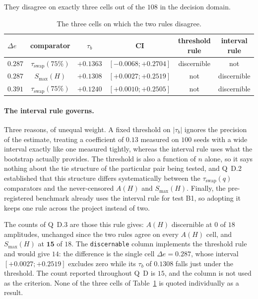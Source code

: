 \documentclass[11pt,a4paper]{article}
\begin{document}
They disagree on exactly three cells out of the $108$ in the decision domain.

\begin{table}[htbp]
  \centering
  \begin{tabular}{lccccc}
    \toprule
    $\Delta e$ & comparator & $\tau_b$ & CI & threshold rule & interval rule \\
    \midrule
    $0.287$ & $\tau_{\mathrm{swap}}(75\%)$ & $+0.1363$ & $[-0.0068 ; +0.2704]$ & discernible & not \\
    $0.287$ & $S_{\max}(H)$                & $+0.1308$ & $[+0.0027 ; +0.2519]$ & not & discernible \\
    $0.391$ & $\tau_{\mathrm{swap}}(75\%)$ & $+0.1240$ & $[+0.0010 ; +0.2505]$ & not & discernible \\
    \bottomrule
  \end{tabular}
  \caption{The three cells on which the two rules disagree.}
  \label{tab:regles}
\end{table}

\paragraph{The interval rule governs.} Three reasons, of unequal weight. A fixed threshold
on $|\tau_b|$ ignores the precision of the estimate, treating a coefficient of $0.13$
measured on $100$ seeds with a wide interval exactly like one measured tightly, whereas the
interval rule uses what the bootstrap actually provides. The threshold is also a function
of $n$ alone, so it says nothing about the tie structure of the particular pair being
tested, and Q~D.2 established that this structure differs systematically between the
$\tau_{\mathrm{swap}}(q)$ comparators and the never-censored $A(H)$ and $S_{\max}(H)$.
Finally, the pre-registered benchmark already uses the interval rule for test B1, so
adopting it keeps one rule across the project instead of two.

The counts of Q~D.3 are those this rule gives: $A(H)$ discernible at $0$ of $18$
amplitudes, unchanged since the two rules agree on every $A(H)$ cell, and $S_{\max}(H)$ at
$\mathbf{15}$ of $18$. The \texttt{discernable} column implements the threshold rule and
would give $14$: the difference is the single cell $\Delta e = 0.287$, whose interval
$[+0.0027 ; +0.2519]$ excludes zero while its $\tau_b$ of $0.1308$ falls just under the
threshold. The count reported throughout Q~D is $15$, and the column is not used as the
criterion. None of the three cells of Table~\ref{tab:regles} is quoted individually as a
result.
\end{document}
